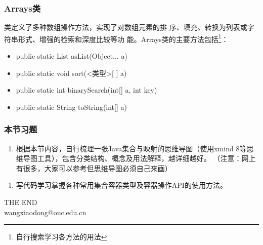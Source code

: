 \begin{frame}[fragile] %
  \frametitle{Arrays类}

   类定义了多种数组操作方法，实现了对数组元素的排
  序、填充、转换为列表或字符串形式、增强的检索和深度比较等功
  能。Arrays类的主要方法包括\footnote{自行搜索学习各方法的用法}：

  \begin{itemize}
  \item public static List asList(Object... a)
  \item public static void sort(<类型>[ ] a)
  \item public static int binarySearch(int[] a, int key)
  \item public static String toString(int[] a)
  \end{itemize}
\end{frame}


\begin{frame}[fragile]
  \frametitle{本节习题}

  \begin{enumerate}
  \item 根据本节内容，自行梳理一张Java集合与映射的思维导图（使用xmind
    8等思维导图工具），包含分类结构、概念及用法解释，越详细越好。{\kai
      （注意：网上有很多，大家可以参考但思维导图必须自己来画）}
  \end{enumerate}
  
  
  \begin{enumerate}
  \item 写代码学习掌握各种常用集合容器类型及容器操作API的使用方法。
  \end{enumerate}

\end{frame}


\begin{frame}[focus]
  \centering
  {\Huge {THE END}} \\
  \vspace{5mm}
  {\Large wangxiaodong@ouc.edu.cn} \\
\end{frame}
